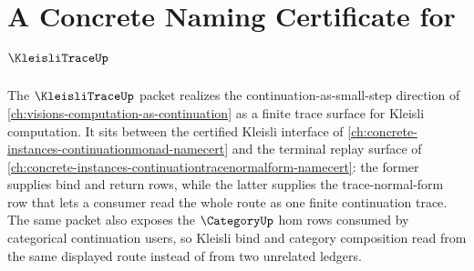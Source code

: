 \chapter{A Concrete Naming Certificate for $\KleisliTraceUp$}
\label{ch:concrete-instances-kleislitrace-namecert}

The $\KleisliTraceUp$ packet realizes the continuation-as-small-step direction of \autoref{ch:visions-computation-as-continuation} as a finite trace surface for Kleisli computation. It sits between the certified Kleisli interface of \autoref{ch:concrete-instances-continuationmonad-namecert} and the terminal replay surface of \autoref{ch:concrete-instances-continuationtracenormalform-namecert}: the former supplies bind and return rows, while the latter supplies the trace-normal-form row that lets a consumer read the whole route as one finite continuation trace. The same packet also exposes the $\CategoryUp$ hom rows consumed by categorical continuation users, so Kleisli bind and category composition read from the same displayed route instead of from two unrelated ledgers.



